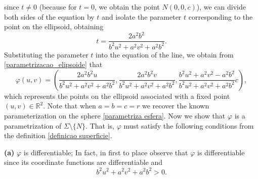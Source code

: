 \documentclass{amsart}
\theoremstyle{plain}
\numberwithin{equation}{section}
\begin{document}
since \( t \neq 0 \) (because for \( t = 0 \), we obtain the point \( N(0,0,c) \)), we can divide both sides of the equation by \( t \) and isolate the parameter \( t \) corresponding to the point on the ellipsoid, obtaining
\[
t = \dfrac{2a^2b^2}{b^2 u^2 + a^2 v^2 + a^2 b^2}.
\]
Substituting the parameter \( t \) into the equation of the line, we obtain from \eqref{parametrizacao_elipsoide} that
\begin{equation}\label{par_elips}
	\varphi(u,v) = \left(  \dfrac{2a^2 b^2 u}{b^2u^2 + a^2v^2 + a^2 b^2} , \dfrac{2a^2 b^2 v}{b^2u^2 + a^2v^2 + a^2 b^2} , \dfrac{b^2 u^2 + a^2 v^2 - a^2 b^2}{b^2u^2 + a^2v^2 + a^2 b^2} c \right),
\end{equation}
which represents the points on the ellipsoid associated with a fixed point \( (u,v) \in \mathbb{R}^2 \). Note that when $a=b=c=r$ we recover the known parameterization on the sphere \eqref{parametriza esfera}. Now we show that \( \varphi \) is a parametrization of \( \Sigma \setminus \{N\} \). That is, \( \varphi \) must satisfy the following conditions from the definition \ref{definicao superficie}.

\noindent\textbf{(a)} \( \varphi \) is differentiable; In fact, in first to place observe that \( \varphi \) is differentiable since its coordinate functions are differentiable and 
$$
b^2u^2 + a^2v^2 + a^2 b^2 > 0.
$$ 
\end{document}

